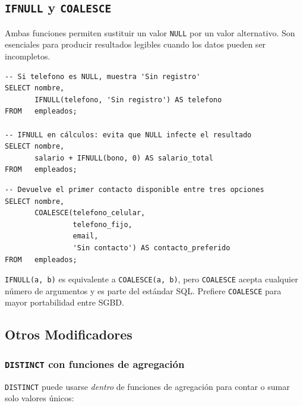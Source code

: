 \subsection{\texttt{IFNULL} y \texttt{COALESCE}}

Ambas funciones permiten sustituir un valor \texttt{NULL} por un
valor alternativo.
Son esenciales para producir resultados legibles cuando los datos
pueden ser incompletos.

\begin{lstlisting}[caption={IFNULL: sustituye NULL por un valor por defecto.}]
-- Si telefono es NULL, muestra 'Sin registro'
SELECT nombre,
       IFNULL(telefono, 'Sin registro') AS telefono
FROM   empleados;

-- IFNULL en cálculos: evita que NULL infecte el resultado
SELECT nombre,
       salario + IFNULL(bono, 0) AS salario_total
FROM   empleados;
\end{lstlisting}

\begin{lstlisting}[caption={COALESCE: devuelve el primer valor no NULL de una lista.}]
-- Devuelve el primer contacto disponible entre tres opciones
SELECT nombre,
       COALESCE(telefono_celular,
                telefono_fijo,
                email,
                'Sin contacto') AS contacto_preferido
FROM   empleados;
\end{lstlisting}

\begin{nota}
\texttt{IFNULL(a, b)} es equivalente a \texttt{COALESCE(a, b)},
pero \texttt{COALESCE} acepta cualquier número de argumentos y
es parte del estándar SQL.
Prefiere \texttt{COALESCE} para mayor portabilidad entre SGBD.
\end{nota}

\subsection{Otros Modificadores}

\subsubsection{\texttt{DISTINCT} con funciones de agregación}

\texttt{DISTINCT} puede usarse \textit{dentro} de funciones de
agregación para contar o sumar solo valores únicos:

